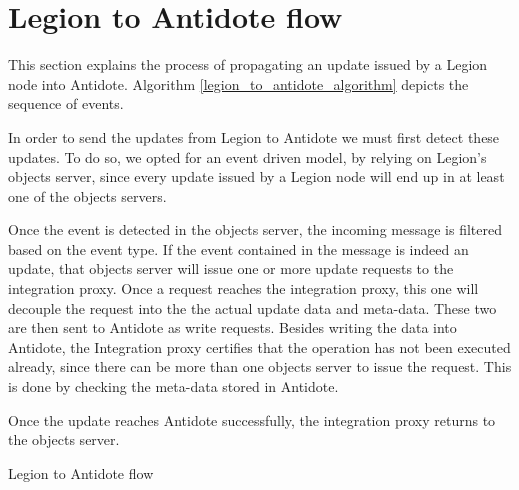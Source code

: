 \section{Legion to Antidote flow}
\label{sec:legion_to_antidote_flow}
This section explains the process of propagating an update issued by a Legion node into Antidote. Algorithm \ref{legion_to_antidote_algorithm} depicts the sequence of events.\par
	In order to send the updates from Legion to Antidote we must first detect these updates. To do so, we opted for an event driven model, by relying on Legion's objects server, since every update issued by a Legion node will end up in at least one of the objects servers.\par
	Once the event is detected in the objects server, the incoming message is filtered based on the event type. If the event contained in the message is indeed an update, that objects server will issue one or more update requests to the integration proxy. Once a request reaches the integration proxy, this one will decouple the request into the the actual update data and meta-data. These two are then sent to Antidote as write requests. Besides writing the data into Antidote, the Integration proxy certifies that the operation has not been executed already, since there can be more than one objects server to issue the request. This is done by checking the meta-data stored in Antidote.\par
	Once the update reaches Antidote successfully, the integration proxy returns to the objects server.
	
\begin{algorithm}
\caption{Legion to Antidote flow}
\label{legion_to_antidote_algorithm}
\begin{algorithmic}[1]
    \EndIf
  \EndIf
\End
\end{algorithmic}
\end{algorithm}

